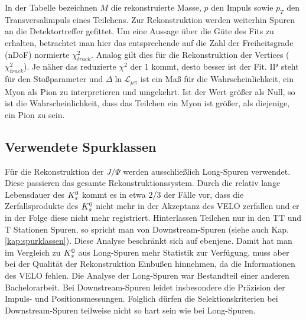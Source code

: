 In der Tabelle bezeichnen $M$ die rekonstruierte Masse, $p$ den Impuls sowie $p_T$ den Transversalimpuls eines Teilchens. Zur Rekonstruktion werden weiterhin Spuren an die Detektortreffer gefittet. Um eine Aussage über die Güte des Fits zu erhalten, betrachtet man hier das entsprechende auf die Zahl der Freiheitsgrade (nDoF) normierte $\chi_{track}^2$. Analog gilt dies für die Rekonstruktion der Vertices ($\chi_{track}^2$). Je näher das reduzierte $\chi^2$ der 1 kommt, desto besser ist der Fit. IP steht für den Stoßparameter und $\Delta \ln \mathcal{L}_{\mu\pi}$ ist ein Maß für die Wahrscheinlichkeit, ein Myon als Pion zu interpretieren und umgekehrt. Ist der Wert größer als Null, so ist die Wahrscheinlichkeit, dass das Teilchen ein Myon ist größer, als diejenige, ein Pion zu sein.

\subsection{Verwendete Spurklassen} \label{kap:downstream}
Für die Rekonstruktion der $J/\Psi$ werden ausschließlich \glqq Long\grqq-Spuren verwendet. Diese passieren das gesamte Rekonstruktionssystem. Durch die relativ lange Lebensdauer des $K_s^0$ kommt es in etwa 2/3 der Fälle vor, dass die Zerfallsprodukte des $K_s^0$ nicht mehr in der Akzeptanz des VELO zerfallen und er in der Folge diese nicht mehr registriert. Hinterlassen Teilchen nur in den TT und T Stationen Spuren, so spricht man von \glqq Downstream\grqq-Spuren (siehe auch Kap. \ref{kap:spurklassen}). Diese Analyse beschränkt sich auf ebenjene. Damit hat man im Vergleich zu $K_s^0$ aus Long-Spuren mehr Statistik zur Verfügung, muss aber bei der Qualität der Rekonstruktion Einbußen hinnehmen, da die Informationen des VELO fehlen. Die Analyse der Long-Spuren war Bestandteil einer anderen Bachelorarbeit. Bei Downstream-Spuren leidet insbesondere die Präzision der Impuls- und Positionsmessungen. Folglich dürfen die Selektionskriterien bei Downstream-Spuren teilweise nicht so hart sein wie bei Long-Spuren. \cite{lhcb-paper}

